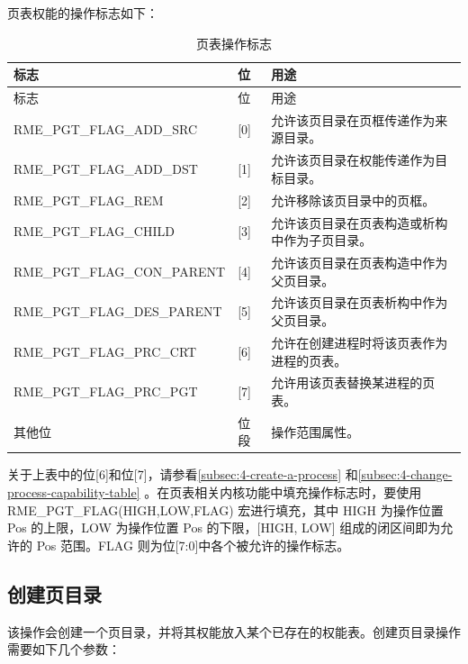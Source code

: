 页表权能的操作标志如下：

\begin{xltabular}{\textwidth}{@{}>{\hsize\raggedright\arraybackslash}X>{\hsize\raggedright\arraybackslash}X>{\hsize\raggedright\arraybackslash}X@{}}
\caption{页表操作标志}\label{tab:3-9-page-table-operation-flags}\\
\toprule
标志 & 位 & 用途\tabularnewline
\endfirsthead
\toprule
标志 & 位 & 用途\tabularnewline
\midrule
\endhead
\bottomrule
\endlastfoot
RME\_PGT\_FLAG\_ADD\_SRC & {[}0{]} &
允许该页目录在页框传递作为来源目录。\tabularnewline
RME\_PGT\_FLAG\_ADD\_DST & {[}1{]} &
允许该页目录在权能传递作为目标目录。\tabularnewline
RME\_PGT\_FLAG\_REM & {[}2{]} &
允许移除该页目录中的页框。\tabularnewline
RME\_PGT\_FLAG\_CHILD & {[}3{]} &
允许该页目录在页表构造或析构中作为子页目录。\tabularnewline
RME\_PGT\_FLAG\_CON\_PARENT & {[}4{]} &
允许该页目录在页表构造中作为父页目录。\tabularnewline
RME\_PGT\_FLAG\_DES\_PARENT & {[}5{]} &
允许该页目录在页表析构中作为父页目录。\tabularnewline
RME\_PGT\_FLAG\_PRC\_CRT & {[}6{]} &
允许在创建进程时将该页表作为进程的页表。\tabularnewline
RME\_PGT\_FLAG\_PRC\_PGT & {[}7{]} &
允许用该页表替换某进程的页表。\tabularnewline
其他位 & 位段 & 操作范围属性。\tabularnewline
\end{xltabular}

关于上表中的位{[}6{]}和位{[}7{]}，请参看\ref{subsec:4-create-a-process}
和\ref{subsec:4-change-process-capability-table}
。在页表相关内核功能中填充操作标志时，要使用 RME\_PGT\_FLAG(HIGH,LOW,FLAG) 宏进行填充，其中 HIGH 为操作位置 Pos 的上限，LOW 为操作位置 Pos 的下限，[HIGH, LOW] 组成的闭区间即为允许的 Pos 范围。FLAG 则为位{[}7:0{]}中各个被允许的操作标志。

\subsection{创建页目录}\label{subsec:3-create-page-directory}

该操作会创建一个页目录，并将其权能放入某个已存在的权能表。创建页目录操作需要如下几个参数：

